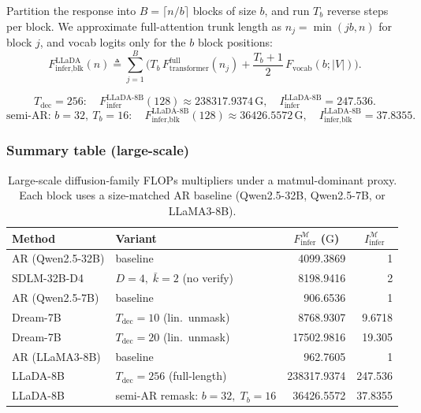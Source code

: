 \documentclass[11pt]{article}
\newcommand{\G}{\mathrm{G}} %
\begin{document}
Partition the response into $B=\lceil n/b\rceil$ blocks of size $b$, and run $T_b$ reverse steps per block.
We approximate full-attention trunk length as $n_j=\min(jb,n)$ for block $j$, and vocab logits only for the $b$ block positions:
\[
F_{\text{infer,blk}}^{\text{LLaDA}}(n)
\triangleq
\sum_{j=1}^{B}
\Big(
T_b\,F_{\text{transformer}}^{\text{full}}(n_j)
+
\frac{T_b+1}{2}\,F_{\text{vocab}}(b;|V|)
\Big).
\]

\[
T_{\text{dec}}=256:\quad
F_{\text{infer}}^{\text{LLaDA-8B}}(128)\approx \num{238317.9374}\,\G,
\quad
I_{\text{infer}}^{\text{LLaDA-8B}}=\num{247.536}.
\]
\[
\text{semi-AR: } b=32,\ T_b=16:\quad
F_{\text{infer,blk}}^{\text{LLaDA-8B}}(128)\approx \num{36426.5572}\,\G,
\quad
I_{\text{infer,blk}}^{\text{LLaDA-8B}}=\num{37.8355}.
\]

\subsubsection{Summary table (large-scale)}
\label{app:diff_family_table_big}

\begin{table}[t]
\centering
\small
\setlength{\tabcolsep}{4pt}
\begin{tabular}{llrr}
\toprule
Method & Variant
& \multicolumn{1}{c}{$F_{\text{infer}}^{\mathcal{M}}$ ($\G$)}
& \multicolumn{1}{c}{$I_{\text{infer}}^{\mathcal{M}}$} \\
\midrule
AR (Qwen2.5-32B) & baseline
& \num{4099.3869} & 1 \\
SDLM-32B-D4 & $D{=}4,\;\bar{k}{=}2$ (no verify)
& \num{8198.9416} & \num{2} \\
\midrule
AR (Qwen2.5-7B) & baseline
& \num{906.6536} & 1 \\
Dream-7B & $T_{\text{dec}}{=}10$ (lin.\ unmask)
& \num{8768.9307} & \num{9.6718} \\
Dream-7B & $T_{\text{dec}}{=}20$ (lin.\ unmask)
& \num{17502.9816} & \num{19.305} \\
\midrule
AR (LLaMA3-8B) & baseline
& \num{962.7605} & 1 \\
LLaDA-8B & $T_{\text{dec}}{=}256$ (full-length)
& \num{238317.9374} & \num{247.536} \\
LLaDA-8B & semi-AR remask: $b{=}32,\;T_b{=}16$
& \num{36426.5572} & \num{37.8355} \\
\bottomrule
\end{tabular}
\caption{Large-scale diffusion-family FLOPs multipliers under a matmul-dominant proxy.
Each block uses a size-matched AR baseline (Qwen2.5-32B, Qwen2.5-7B, or LLaMA3-8B).}
\end{table}
\end{document}
